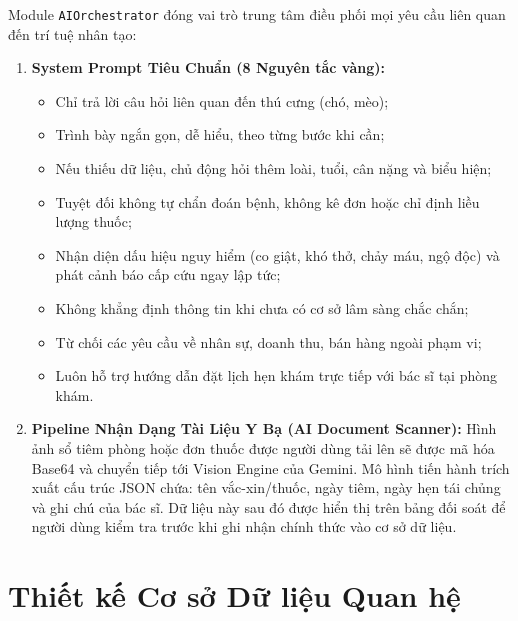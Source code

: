 Module \texttt{AIOrchestrator} đóng vai trò trung tâm điều phối mọi yêu cầu liên quan đến trí tuệ nhân tạo:

\begin{enumerate}[label=\arabic*.]
    \item \textbf{System Prompt Tiêu Chuẩn (8 Nguyên tắc vàng):}
    \begin{itemize}
        \item Chỉ trả lời câu hỏi liên quan đến thú cưng (chó, mèo);
        \item Trình bày ngắn gọn, dễ hiểu, theo từng bước khi cần;
        \item Nếu thiếu dữ liệu, chủ động hỏi thêm loài, tuổi, cân nặng và biểu hiện;
        \item Tuyệt đối không tự chẩn đoán bệnh, không kê đơn hoặc chỉ định liều lượng thuốc;
        \item Nhận diện dấu hiệu nguy hiểm (co giật, khó thở, chảy máu, ngộ độc) và phát cảnh báo cấp cứu ngay lập tức;
        \item Không khẳng định thông tin khi chưa có cơ sở lâm sàng chắc chắn;
        \item Từ chối các yêu cầu về nhân sự, doanh thu, bán hàng ngoài phạm vi;
        \item Luôn hỗ trợ hướng dẫn đặt lịch hẹn khám trực tiếp với bác sĩ tại phòng khám.
    \end{itemize}
    \item \textbf{Pipeline Nhận Dạng Tài Liệu Y Bạ (AI Document Scanner):}
    Hình ảnh sổ tiêm phòng hoặc đơn thuốc được người dùng tải lên sẽ được mã hóa Base64 và chuyển tiếp tới Vision Engine của Gemini. Mô hình tiến hành trích xuất cấu trúc JSON chứa: tên vắc-xin/thuốc, ngày tiêm, ngày hẹn tái chủng và ghi chú của bác sĩ. Dữ liệu này sau đó được hiển thị trên bảng đối soát để người dùng kiểm tra trước khi ghi nhận chính thức vào cơ sở dữ liệu.
\end{enumerate}

\section{Thiết kế Cơ sở Dữ liệu Quan hệ}
\label{sec:thietke_csdl}

